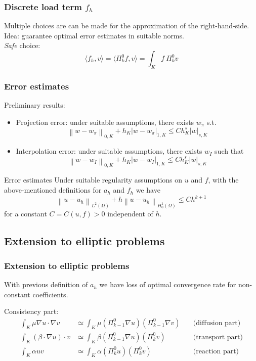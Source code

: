 \documentclass[10pt]{beamer}
\newcommand{\norm}[2]{\left\lVert#1\right\rVert_{#2}}
\newcommand{\dof}{\text{dof}}
\begin{document}
\begin{frame} \frametitle{Discrete load term $f_h$}
	Multiple choices are can be made for the approximation of the right-hand-side. \\ 
	Idea: guarantee optimal error estimates in suitable norms. \\
	\vspace{0.5cm}
	\textit{Safe} choice:
	\begin{equation*}
	\langle f_h,v \rangle= \langle \Pi_{k}^0 f, v \rangle = \int_K f \ \Pi_{k}^0 v
	\label{eqn:RHS_impl}
	\end{equation*}
\end{frame}

\begin{frame} \frametitle{Error estimates}
	Preliminary results:
	\begin{itemize}
		\item Projection error: under suitable assumptions, there exists $w_\pi$ s.t.
		$$\norm{w-w_\pi}{0,K}+h_K |w-w_\pi|_{1,K} \leq C h_K^s |w|_{s,K}$$
		\item Interpolation error: under suitable assumptions, there exists $w_I$ such that
		$$\norm{w-w_I}{0,K}+h_K |w-w_I|_{1,K} \leq C h_K^s |w|_{s,K}$$
	\end{itemize}
	\begin{block}{Error estimates}
		Under suitable regularity assumptions on $u$ and $f$, with the above-mentioned definitions for $a_h$ and $f_h$ we have
		$$\norm{u-u_h}{L^2(\Omega)} +h \norm{u-u_h}{H_0^1(\Omega)} \leq C h^{k+1}$$ for a constant $C=C(u,f)>0$ independent of $h$.
	\end{block}
\end{frame}
	
	\subsection{Extension to elliptic problems}
	\begin{frame} \frametitle{Extension to elliptic problems}
		
With previous definition of $a_h$ we have loss of optimal convergence rate for non-constant coefficients.

Consistency part:
	\begin{align*}
	\int_K \mu \nabla u \cdot \nabla v &\simeq \int_K \mu (\Pi^0_{k-1} \nabla u) (\Pi^0_{k-1} \nabla v)& \quad \text{(diffusion part)} 
	\\
	\int_K (\beta \cdot \nabla u) \cdot v &\simeq \int_K \beta (\Pi^0_{k-1} \nabla u) (\Pi^0_{k} v) & \quad \text{(transport part)} \\
	\int_K \alpha u v &\simeq \int_K \alpha (\Pi^0_{k} u) (\Pi^0_{k} v) & \quad \text{(reaction part)} 
	\end{align*}
\end{frame}
\end{document}
